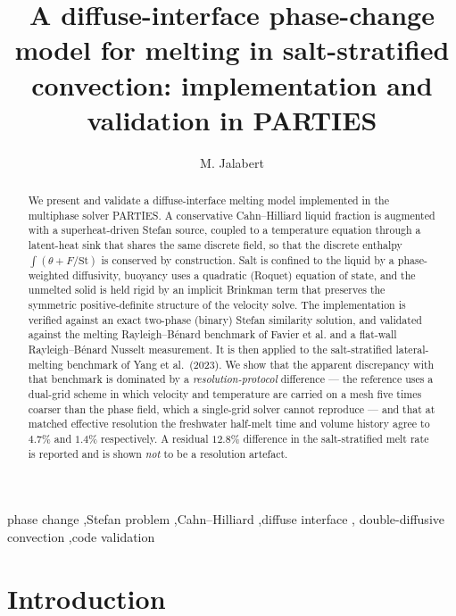 \documentclass[review,12pt]{elsarticle}
\newcommand{\St}{\mathrm{St}}
\begin{document}
\begin{frontmatter}

\title{A diffuse-interface phase-change model for melting in salt-stratified
convection: implementation and validation in PARTIES}

\author[ucsb]{M. Jalabert}

\begin{abstract}
We present and validate a diffuse-interface melting model implemented in the
multiphase solver PARTIES. A conservative Cahn--Hilliard liquid fraction is
augmented with a superheat-driven Stefan source, coupled to a temperature
equation through a latent-heat sink that shares the same discrete field, so
that the discrete enthalpy $\int(\theta + F/\St)$ is conserved by construction.
Salt is confined to the liquid by a phase-weighted diffusivity, buoyancy uses a
quadratic (Roquet) equation of state, and the unmelted solid is held rigid by an
implicit Brinkman term that preserves the symmetric positive-definite structure
of the velocity solve. The implementation is verified against an exact
two-phase (binary) Stefan similarity solution, and validated against the melting
Rayleigh--B\'enard benchmark of Favier et al. and a flat-wall Rayleigh--B\'enard
Nusselt measurement. It is then applied to the salt-stratified lateral-melting
benchmark of Yang et al.\ (2023). We show that the apparent discrepancy with
that benchmark is dominated by a \emph{resolution-protocol} difference --- the
reference uses a dual-grid scheme in which velocity and temperature are carried
on a mesh five times coarser than the phase field, which a single-grid solver
cannot reproduce --- and that at matched effective resolution the freshwater
half-melt time and volume history agree to $4.7\%$ and $1.4\%$ respectively.
A residual $12.8\%$ difference in the salt-stratified melt rate is reported and
is shown \emph{not} to be a resolution artefact.
\end{abstract}

\begin{keyword}
phase change \sep Stefan problem \sep Cahn--Hilliard \sep diffuse interface \sep
double-diffusive convection \sep code validation
\end{keyword}

\end{frontmatter}

\linenumbers

\section{Introduction}
\label{sec:intro}
\end{document}
